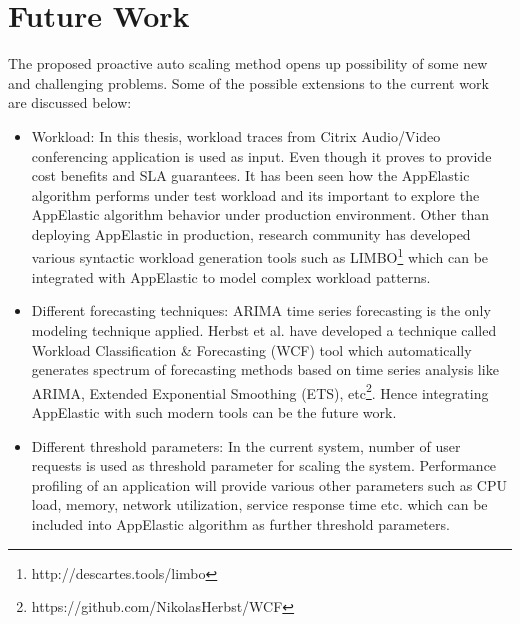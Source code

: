 \section{Future Work}
\label{sec:Future Work}
The proposed proactive auto scaling method opens up possibility of some new and challenging problems. Some of the possible extensions to the current work are discussed below:
\begin{itemize}
  \item Workload: In this thesis, workload traces from Citrix Audio/Video conferencing application is used as input. Even though it proves to provide cost benefits and SLA guarantees. It has been seen how the AppElastic algorithm performs under test workload and its important to explore the AppElastic algorithm behavior under production environment. Other than deploying AppElastic in production, research community has developed various syntactic workload generation tools such as LIMBO\cite{von2014limbo}\footnote{http://descartes.tools/limbo} which can be integrated with AppElastic to model complex workload patterns.
  \item Different forecasting techniques: ARIMA time series forecasting is the only modeling technique applied. Herbst et al.\cite{herbst2012workload} have developed a technique called Workload Classification \& Forecasting (WCF) tool which automatically generates spectrum of forecasting methods based on time series analysis like ARIMA, Extended Exponential Smoothing (ETS), etc\cite{herbst2012workload}\footnote{https://github.com/NikolasHerbst/WCF}. Hence integrating AppElastic with such modern tools can be the future work.
  \item Different threshold parameters: In the current system, number of user requests is used as threshold parameter for scaling the system. Performance profiling of an application will provide various other parameters such as CPU load, memory, network utilization, service response time etc. which can be included into AppElastic algorithm as further threshold parameters.
\end{itemize}
